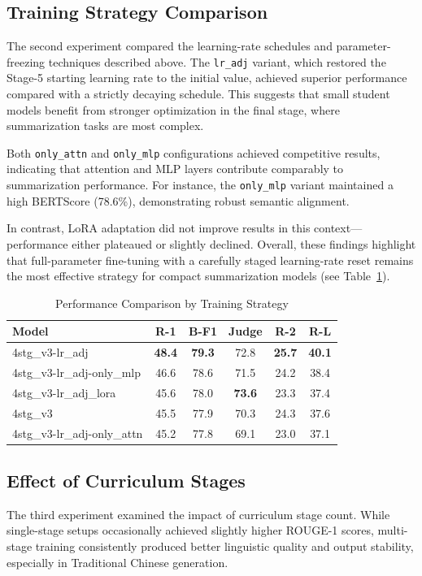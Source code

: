 \documentclass[preprint,12pt]{elsarticle}
\begin{document}
\subsection{Training Strategy Comparison}
The second experiment compared the learning-rate schedules and parameter-freezing techniques described above.
The \texttt{lr\_adj} variant, which restored the Stage-5 starting learning rate to the initial value, achieved superior performance compared with a strictly decaying schedule.  
This suggests that small student models benefit from stronger optimization in the final stage, where summarization tasks are most complex.

Both \texttt{only\_attn} and \texttt{only\_mlp} configurations achieved competitive results, indicating that attention and MLP layers contribute comparably to summarization performance.  
For instance, the \texttt{only\_mlp} variant maintained a high BERTScore (78.6\%), demonstrating robust semantic alignment.

In contrast, LoRA adaptation did not improve results in this context—performance either plateaued or slightly declined.  
Overall, these findings highlight that full-parameter fine-tuning with a carefully staged learning-rate reset remains the most effective strategy for compact summarization models (see Table~\ref{training_strategy_comparison}).

\begin{table}[t]
\centering
\begin{tabular}{lccccc}
\hline
Model & R-1 & B-F1 & Judge & R-2 & R-L \\
\hline
4stg\_v3-lr\_adj & \textbf{48.4} & \textbf{79.3} & 72.8 & \textbf{25.7} & \textbf{40.1} \\
4stg\_v3-lr\_adj-only\_mlp & 46.6 & 78.6 & 71.5 & 24.2 & 38.4 \\
4stg\_v3-lr\_adj\_lora & 45.6 & 78.0 & \textbf{73.6} & 23.3 & 37.4 \\
4stg\_v3 & 45.5 & 77.9 & 70.3 & 24.3 & 37.6 \\
4stg\_v3-lr\_adj-only\_attn & 45.2 & 77.8 & 69.1 & 23.0 & 37.1 \\
\hline
\end{tabular}
\caption{Performance Comparison by Training Strategy}\label{training_strategy_comparison}
\end{table}

\subsection{Effect of Curriculum Stages}
The third experiment examined the impact of curriculum stage count.  
While single-stage setups occasionally achieved slightly higher ROUGE-1 scores, multi-stage training consistently produced better linguistic quality and output stability, especially in Traditional Chinese generation.
\end{document}
